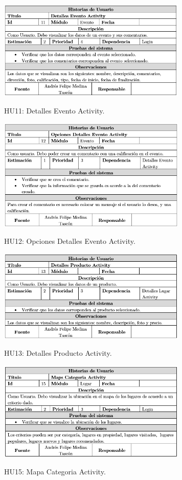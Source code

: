 \documentclass[12pt,letterpaper,openany]{book}
\begin{document}
\begin{table}[H]
\centering
\includegraphics[width=9cm]{./imagenes/HU/HU11}
\caption{HU11: Detalles Evento Activity.}
\end{table}

\begin{table}[H]
\centering
\includegraphics[width=9cm]{./imagenes/HU/HU12}
\caption{HU12: Opciones Detalles Evento Activity.}
\end{table}

\begin{table}[H]
\centering
\includegraphics[width=9cm]{./imagenes/HU/HU13}
\caption{HU13: Detalles Producto Activity.}
\end{table}

\begin{table}[H]
\centering
\includegraphics[width=9cm]{./imagenes/HU/HU15}
\caption{HU15: Mapa Categoria Activity.}
\end{table}
\end{document}
